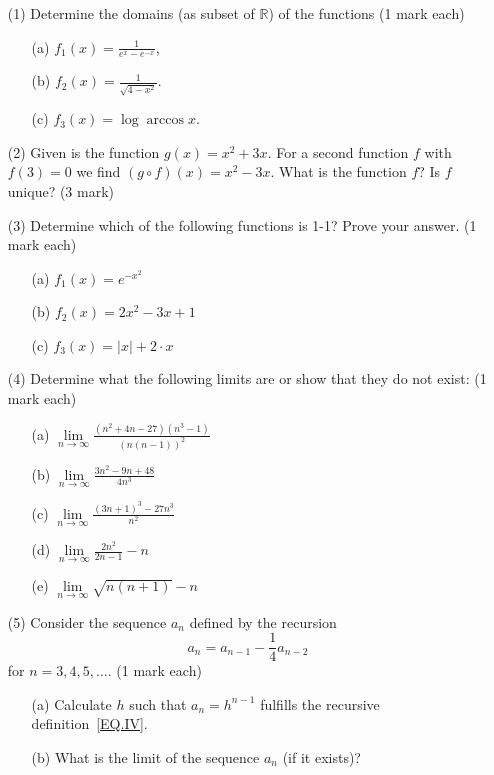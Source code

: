 \documentclass[12pt,english]{article}
\begin{document}
\begin{itemize}
\item[(1)]
Determine the domains (as subset of $\mathbb{R}$)  of the functions \hfill{(1 mark each)}
\begin{itemize}
    \item[(a)] $f_1(x)=\frac{1}{e^{x}-e^{-x}}$,
    \item[(b)] $f_2(x)=\frac{1}{\sqrt{4-x^2}}$.
    \item[(c)] $f_3(x)=\log{\arccos{x}}$.
    
\end{itemize}
\item[(2)]
Given is the function $g(x)=x^2+3x$. For a second function $f$ with $f(3)=0$ we find $(g \circ f)(x) = x^2-3x$. 
What is the function $f$? Is $f$ unique?
\hfill{(3 mark)}


\item[(3)]
Determine which of the following functions is 1-1? Prove your answer. \hfill{(1 mark each)}
\begin{itemize}
\item[(a)] $f_1(x)=e^{-x^2}$
\item[(b)] $f_2(x)=2x^2-3x+1$
\item[(c)] $f_3(x)=|x|+2 \cdot x$
\end{itemize}

\item[(4)]
Determine what the following limits are or show that they do not exist: \hfill{(1 mark each)}
\begin{itemize}
\item[(a)] $ {\lim \limits_{{n\rightarrow \infty}}} \frac{(n^2+4 n-27)(n^3-1)}{(n(n-1))^2} $
\item[(b)] $\lim \limits_{n\rightarrow \infty} \frac{3n^2-9n + 48}{4n^3}$
\item[(c)] $\lim \limits_{n\rightarrow \infty} \frac{(3n+1)^3-27n^3}{n^2}$
\item[(d)] $\lim \limits_{n\rightarrow \infty} \frac{2n^2}{2n-1}-n$
\item[(e)] $\lim \limits_{n\rightarrow \infty} \sqrt{n(n+1)}-n$
\end{itemize}

\vfill\hspace*{\fill}{\em Turn over for more questions}

\newpage

\item[(5)] Consider the sequence $a_n$ defined by the recursion 
\begin{equation}
a_n=a_{n-1}-\frac{1}{4}a_{n-2}
\label{EQ.IV}    
\end{equation}
for $n=3,4,5,\ldots$. \hfill{(1 mark each)}
\begin{itemize}
    \item[(a)] Calculate $h$ such that $a_n=h^{n-1}$ fulfills the recursive definition~\ref{EQ.IV}.  
\item[(b)]What is the limit of the sequence $a_n$ (if it exists)?
\end{itemize}



\end{itemize}
\end{document}
